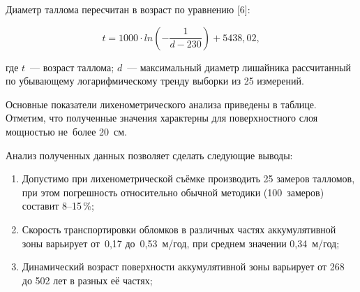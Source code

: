 Диаметр таллома пересчитан в возраст по уравнению [6]:

$$t = 1000\cdot ln{\left(-\frac{1}{d-230}\right)}+5438,02,$$

где $t$~--- возраст таллома; $d$~--- максимальный диаметр лишайника рассчитанный по убывающему логарифмическому тренду выборки из 25 измерений.

Основные показатели лихенометрического анализа приведены в таблице. Отметим, что полученные значения характерны для поверхностного слоя мощностью не~более 20~см.





\clearpage

Анализ полученных данных позволяет сделать следующие выводы:

\begin{enumerate}[noitemsep]\vspace{-8pt}
  \item Допустимо при лихенометрической съёмке производить 25 замеров талломов, при этом погрешность относительно обычной методики (100~замеров) составит 8--15\,\%;
  \item Скорость транспортировки обломков в различных частях аккумулятивной зоны варьирует от~0,17 до~0,53~м/год, при среднем значении 0,34~м/год;
  \item Динамический возраст поверхности аккумулятивной зоны варьирует от 268 до 502 лет в разных её частях;
\end{enumerate}



